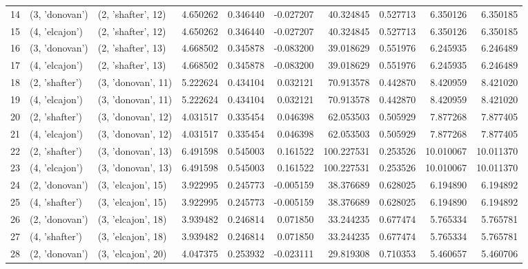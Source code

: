 \begin{tabular}{lllrrrrrrr}
14 &   (3, 'donovan') &  (2, 'shafter', 12) &  4.650262 &   0.346440 & -0.027207 &   40.324845 &  0.527713 &   6.350126 &   6.350185 \\
15 &   (4, 'elcajon') &  (2, 'shafter', 12) &  4.650262 &   0.346440 & -0.027207 &   40.324845 &  0.527713 &   6.350126 &   6.350185 \\
16 &   (3, 'donovan') &  (2, 'shafter', 13) &  4.668502 &   0.345878 & -0.083200 &   39.018629 &  0.551976 &   6.245935 &   6.246489 \\
17 &   (4, 'elcajon') &  (2, 'shafter', 13) &  4.668502 &   0.345878 & -0.083200 &   39.018629 &  0.551976 &   6.245935 &   6.246489 \\
18 &   (2, 'shafter') &  (3, 'donovan', 11) &  5.222624 &   0.434104 &  0.032121 &   70.913578 &  0.442870 &   8.420959 &   8.421020 \\
19 &   (4, 'elcajon') &  (3, 'donovan', 11) &  5.222624 &   0.434104 &  0.032121 &   70.913578 &  0.442870 &   8.420959 &   8.421020 \\
20 &   (2, 'shafter') &  (3, 'donovan', 12) &  4.031517 &   0.335454 &  0.046398 &   62.053503 &  0.505929 &   7.877268 &   7.877405 \\
21 &   (4, 'elcajon') &  (3, 'donovan', 12) &  4.031517 &   0.335454 &  0.046398 &   62.053503 &  0.505929 &   7.877268 &   7.877405 \\
22 &   (2, 'shafter') &  (3, 'donovan', 13) &  6.491598 &   0.545003 &  0.161522 &  100.227531 &  0.253526 &  10.010067 &  10.011370 \\
23 &   (4, 'elcajon') &  (3, 'donovan', 13) &  6.491598 &   0.545003 &  0.161522 &  100.227531 &  0.253526 &  10.010067 &  10.011370 \\
24 &   (2, 'donovan') &  (3, 'elcajon', 15) &  3.922995 &   0.245773 & -0.005159 &   38.376689 &  0.628025 &   6.194890 &   6.194892 \\
25 &   (4, 'shafter') &  (3, 'elcajon', 15) &  3.922995 &   0.245773 & -0.005159 &   38.376689 &  0.628025 &   6.194890 &   6.194892 \\
26 &   (2, 'donovan') &  (3, 'elcajon', 18) &  3.939482 &   0.246814 &  0.071850 &   33.244235 &  0.677474 &   5.765334 &   5.765781 \\
27 &   (4, 'shafter') &  (3, 'elcajon', 18) &  3.939482 &   0.246814 &  0.071850 &   33.244235 &  0.677474 &   5.765334 &   5.765781 \\
28 &   (2, 'donovan') &  (3, 'elcajon', 20) &  4.047375 &   0.253932 & -0.023111 &   29.819308 &  0.710353 &   5.460657 &   5.460706 \\

\end{tabular}

